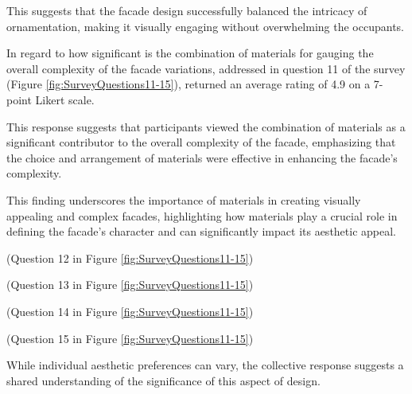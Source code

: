 This suggests that the facade design successfully balanced the intricacy of ornamentation, making it visually engaging without overwhelming the occupants.




In regard to how significant is the combination of materials for gauging the overall complexity of the facade variations, addressed in question 11 of the survey (Figure \ref{fig:SurveyQuestions11-15}), returned an average rating of 4.9 on a 7-point Likert scale.

This response suggests that participants viewed the combination of materials as a significant contributor to the overall complexity of the facade, emphasizing that the choice and arrangement of materials were effective in enhancing the facade's complexity.

This finding underscores the importance of materials in creating visually appealing and complex facades, highlighting how materials play a crucial role in defining the facade's character and can significantly impact its aesthetic appeal.

(Question 12 in Figure \ref{fig:SurveyQuestions11-15})

(Question 13 in Figure \ref{fig:SurveyQuestions11-15})


(Question 14 in Figure \ref{fig:SurveyQuestions11-15})

(Question 15 in Figure \ref{fig:SurveyQuestions11-15})



While individual aesthetic preferences can vary, the collective response suggests a shared understanding of the significance of this aspect of design.




